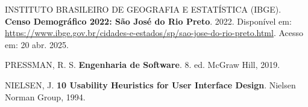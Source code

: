 \documentclass[a4paper, 12pt]{article}
\begin{document}
\begin{thebibliography}{09}
 INSTITUTO BRASILEIRO DE GEOGRAFIA E ESTATÍSTICA (IBGE). 
\textbf{Censo Demográfico 2022: São José do Rio Preto}. 
2022. 
Disponível em: \url{https://www.ibge.gov.br/cidades-e-estados/sp/sao-jose-do-rio-preto.html}. 
Acesso em: 20 abr. 2025.

 PRESSMAN, R. S. 
\textbf{Engenharia de Software}. 
8. ed. McGraw Hill, 2019.

 NIELSEN, J. 
\textbf{10 Usability Heuristics for User Interface Design}. 
Nielsen Norman Group, 1994.
\end{thebibliography}
\end{document}

